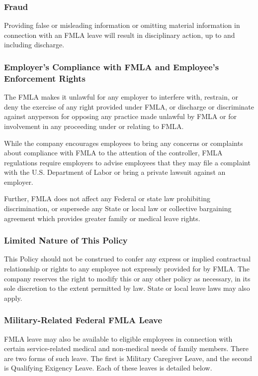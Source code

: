 \documentclass{book}
\begin{document}
\subsubsection{Fraud}

Providing false or misleading information or omitting material information in connection with an FMLA leave will result in disciplinary action, up to and including discharge.

\subsubsection{Employer's Compliance with FMLA and Employee's Enforcement Rights}

The FMLA makes it unlawful for any employer to interfere with, restrain, or deny the exercise of any right provided under FMLA, or discharge or discriminate against anyperson for opposing any practice made unlawful by FMLA or for involvement in any proceeding under or relating to FMLA.

While the company encourages employees to bring any concerns or complaints about compliance with FMLA to the attention of the controller, FMLA regulations require employers to advise employees that they may file a complaint with the U.S. Department of Labor or bring a private lawsuit against an employer.

Further, FMLA does not affect any Federal or state law prohibiting discrimination, or supersede any State or local law or collective bargaining agreement which provides greater family or medical leave rights.

\subsubsection{Limited Nature of This Policy}

This Policy should not be construed to confer any express or implied contractual relationship or rights to any employee not expressly provided for by FMLA. The company reserves the right to modify this or any other policy as necessary, in its sole discretion to the extent permitted by law. State or local leave laws may also apply.

\subsubsection{Military-Related Federal FMLA Leave}

FMLA leave may also be available to eligible employees in connection with certain service-related medical and non-medical needs of family members. There are two forms of such leave. The first is Military Caregiver Leave, and the second is Qualifying Exigency Leave. Each of these leaves is detailed below.
\end{document}
